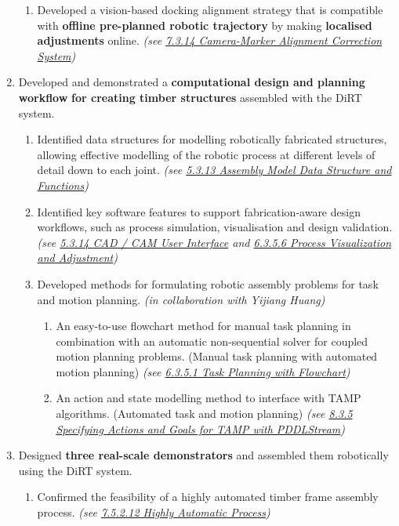 \begin{enumerate}
\begin{enumerate}
		\item Developed a vision-based docking alignment strategy that is compatible with \textbf{offline pre-planned robotic trajectory} by making \textbf{localised adjustments} online. \textit{(see \ul{7.3.14 Camera-Marker Alignment Correction System})}

	\end{enumerate}

	\item Developed and demonstrated a \textbf{computational design and planning workflow} \textbf{for creating timber structures} assembled with the DiRT system.
	\begin{enumerate}
		\item Identified data structures for modelling robotically fabricated structures, allowing effective modelling of the robotic process at different levels of detail down to each joint. \textit{(see \ul{5.3.13 Assembly Model Data Structure and Functions})}

		\item Identified key software features to support fabrication-aware design workflows, such as process simulation, visualisation and design validation. \textit{(see \ul{5.3.14 CAD / CAM User Interface} and \ul{6.3.5.6 Process Visualization and Adjustment})}

		\item Developed methods for formulating robotic assembly problems for task and motion planning. \textit{(in collaboration with Yijiang Huang)} 

		\begin{enumerate}
			\item An easy-to-use flowchart method for manual task planning in combination with an automatic non-sequential solver for coupled motion planning problems. (Manual task planning with automated motion planning) \textit{(see \ul{6.3.5.1 Task Planning with Flowchart})}

			\item An action and state modelling method to interface with TAMP algorithms. (Automated task and motion planning) \textit{(see \ul{8.3.5 Specifying Actions and Goals for TAMP with PDDLStream})}

		\end{enumerate}
	\end{enumerate}

	\item Designed \textbf{three real-scale demonstrators} and assembled them robotically using the DiRT system.
	\begin{enumerate}
		\item Confirmed the feasibility of a highly automated timber frame assembly process. \textit{(see \ul{7.5.2.12 Highly Automatic Process})}


\end{enumerate}
\end{enumerate}
